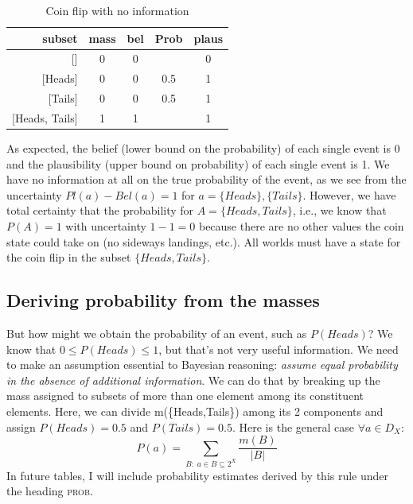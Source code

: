 \documentclass[letterpaper]{article}
\begin{document}
\begin{table}[htbp]
\centering
\caption{Coin flip with no information}
\begin{tabular}{rcccc}
\toprule
                subset&mass &bel  &Prob &plaus\\
\midrule
                    {[]}&0    &0    &     &0    \\
               {[Heads]}&0    &0    &0.5  &1    \\
               {[Tails]}&0    &0    &0.5  &1    \\
        {[Heads, Tails]}&1    &1    &     &1    \\
\bottomrule
\end{tabular}
\label{tab:CoinFlipNoInfo}
\end{table}

As expected, the belief (lower bound on the probability) of each single event is 0 and the plausibility (upper bound on probability) of each single event is 1.  We have no information at all on the true probability of the event, as we see from the uncertainty $Pl(a)-Bel(a)=1$ for $a=\{Heads\},\{Tails\}$.  However, we have total certainty that the probability for $A=\{Heads,Tails\}$, i.e., we know that $P(A)=1$ with uncertainty $1-1=0$ because there are no other values the coin state could take on (no sideways landings, etc.). All worlds must have a state for the coin flip in the subset $\{Heads,Tails\}$.

\subsection{Deriving probability from the masses}
But how might we obtain the probability of an event, such as $P(Heads)$?  We know that $0 \leq P(Heads) \leq 1$, but that's not very useful information. We need to make an assumption essential to Bayesian reasoning: \emph{assume equal probability in the absence of additional information}.  We can do that by breaking up the mass assigned to subsets of more than one element among its constituent elements.  Here, we can divide m(\{Heads,Tails\}) among its 2 components and assign $P(Heads)=0.5$ and $P(Tails)=0.5$.  Here is the general case $\forall a \in D_X$:
\[ P(a) = \sum_{B:\; a \in B \subseteq 2^X}\frac{m(B)}{|B|} \]
In future tables, I will include probability estimates derived by this rule under the heading \textsc{prob}.
\end{document}

